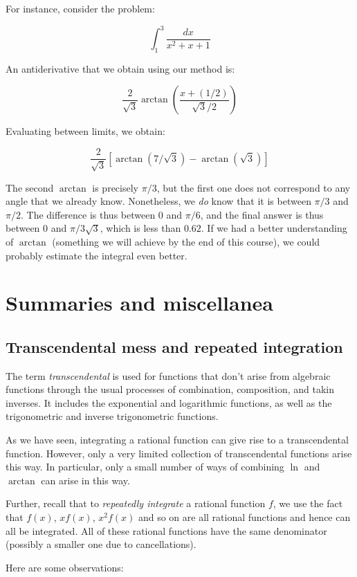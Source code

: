 \documentclass[10pt]{amsart}
\begin{document}
For instance, consider the problem:

$$\int_1^3 \frac{dx}{x^2 + x + 1}$$

An antiderivative that we obtain using our method is:

$$\frac{2}{\sqrt{3}} \arctan \left(\frac{x + (1/2)}{\sqrt{3}/2}\right)$$

Evaluating between limits, we obtain:

$$\frac{2}{\sqrt{3}} \left[\arctan(7/\sqrt{3}) - \arctan(\sqrt{3})\right]$$

The second $\arctan$ is precisely $\pi/3$, but the first one does not
correspond to any angle that we already know. Nonetheless, we {\em do}
know that it is between $\pi/3$ and $\pi/2$. The difference is thus
between $0$ and $\pi/6$, and the final answer is thus between $0$ and
$\pi/3\sqrt{3}$, which is less than $0.62$. If we had a better
understanding of $\arctan$ (something we will achieve by the end of
this course), we could probably estimate the integral even better.

\section{Summaries and miscellanea}

\subsection{Transcendental mess and repeated integration}

The term {\em transcendental} is used for functions that don't arise
from algebraic functions through the usual processes of combination,
composition, and takin inverses. It includes the exponential and
logarithmic functions, as well as the trigonometric and inverse
trigonometric functions.

As we have seen, integrating a rational function can give rise to a
transcendental function. However, only a very limited collection of
transcendental functions arise this way. In particular, only a small
number of ways of combining $\ln$ and $\arctan$ can arise in this way.

Further, recall that to {\em repeatedly integrate} a rational function
$f$, we use the fact that $f(x)$, $xf(x)$, $x^2f(x)$ and so on are all
rational functions and hence can all be integrated. All of these
rational functions have the same denominator (possibly a smaller one
due to cancellations).

Here are some observations:
\end{document}
